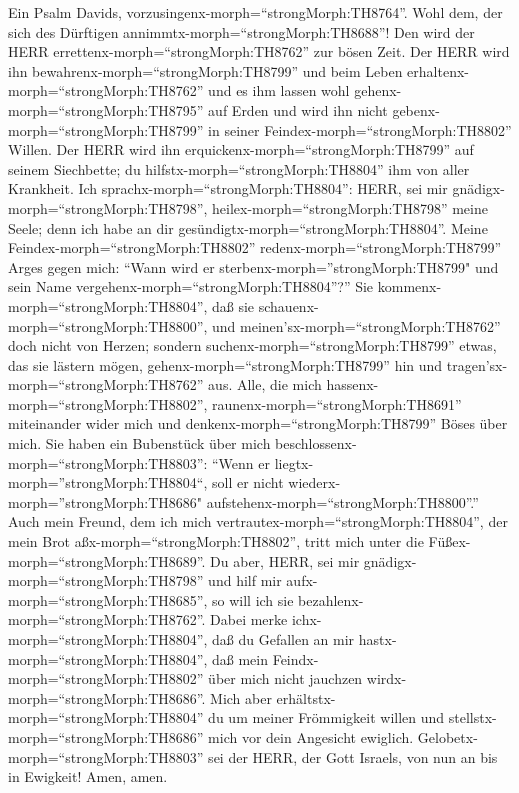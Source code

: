  Ein Psalm Davids,
vorzusingenx-morph=``strongMorph:TH8764''. Wohl dem, der sich des
Dürftigen annimmtx-morph=``strongMorph:TH8688''! Den wird der HERR
errettenx-morph=``strongMorph:TH8762'' zur bösen Zeit.  Der
HERR wird ihn bewahrenx-morph=``strongMorph:TH8799'' und beim Leben
erhaltenx-morph=``strongMorph:TH8762'' und es ihm lassen wohl
gehenx-morph=``strongMorph:TH8795'' auf Erden und wird ihn nicht
gebenx-morph=``strongMorph:TH8799'' in seiner
Feindex-morph=``strongMorph:TH8802'' Willen.  Der HERR wird
ihn erquickenx-morph=``strongMorph:TH8799'' auf seinem Siechbette; du
hilfstx-morph=``strongMorph:TH8804'' ihm von aller Krankheit.
 Ich sprachx-morph=``strongMorph:TH8804'': HERR, sei mir
gnädigx-morph=``strongMorph:TH8798'',
heilex-morph=``strongMorph:TH8798'' meine Seele; denn ich habe an dir
gesündigtx-morph=``strongMorph:TH8804''.  Meine
Feindex-morph=``strongMorph:TH8802'' redenx-morph=``strongMorph:TH8799''
Arges gegen mich: ``Wann wird er sterbenx-morph=''strongMorph:TH8799"
und sein Name vergehenx-morph=``strongMorph:TH8804''?''  Sie
kommenx-morph=``strongMorph:TH8804'', daß sie
schauenx-morph=``strongMorph:TH8800'', und
meinen'sx-morph=``strongMorph:TH8762'' doch nicht von Herzen; sondern
suchenx-morph=``strongMorph:TH8799'' etwas, das sie lästern mögen,
gehenx-morph=``strongMorph:TH8799'' hin und
tragen'sx-morph=``strongMorph:TH8762'' aus.  Alle, die mich
hassenx-morph=``strongMorph:TH8802'',
raunenx-morph=``strongMorph:TH8691'' miteinander wider mich und
denkenx-morph=``strongMorph:TH8799'' Böses über mich.  Sie
haben ein Bubenstück über mich
beschlossenx-morph=``strongMorph:TH8803'': ``Wenn er
liegtx-morph=''strongMorph:TH8804``, soll er nicht
wiederx-morph=''strongMorph:TH8686"
aufstehenx-morph=``strongMorph:TH8800''.''  Auch mein
Freund, dem ich mich vertrautex-morph=``strongMorph:TH8804'', der mein
Brot aßx-morph=``strongMorph:TH8802'', tritt mich unter die
Füßex-morph=``strongMorph:TH8689''.  Du aber, HERR, sei mir
gnädigx-morph=``strongMorph:TH8798'' und hilf mir
aufx-morph=``strongMorph:TH8685'', so will ich sie
bezahlenx-morph=``strongMorph:TH8762''.  Dabei merke
ichx-morph=``strongMorph:TH8804'', daß du Gefallen an mir
hastx-morph=``strongMorph:TH8804'', daß mein
Feindx-morph=``strongMorph:TH8802'' über mich nicht jauchzen
wirdx-morph=``strongMorph:TH8686''.  Mich aber
erhältstx-morph=``strongMorph:TH8804'' du um meiner Frömmigkeit willen
und stellstx-morph=``strongMorph:TH8686'' mich vor dein Angesicht
ewiglich.  Gelobetx-morph=``strongMorph:TH8803'' sei der
HERR, der Gott Israels, von nun an bis in Ewigkeit! Amen, amen.

